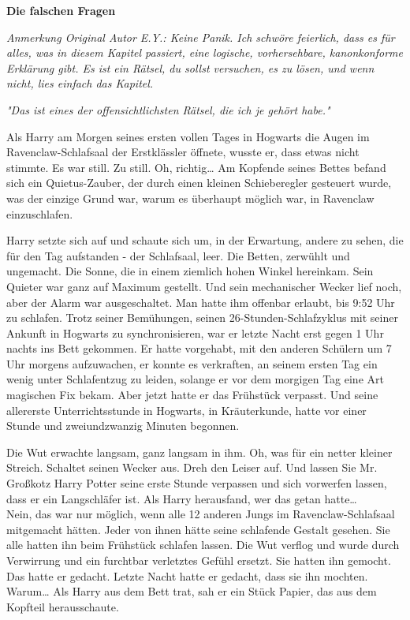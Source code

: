 

\hypertarget{die-falschen-fragen}{%

\textbf{Die falschen Fragen}

\emph{Anmerkung Original Autor E.Y.: Keine Panik. Ich schwöre feierlich, dass es für alles, was in diesem Kapitel passiert, eine logische, vorhersehbare, kanonkonforme Erklärung gibt. Es ist ein Rätsel, du sollst versuchen, es zu lösen, und wenn nicht, lies einfach das Kapitel.}

\emph{"Das ist eines der offensichtlichsten Rätsel, die ich je gehört habe."}

Als Harry am Morgen seines ersten vollen Tages in Hogwarts die Augen im Ravenclaw-Schlafsaal der Erstklässler öffnete, wusste er, dass etwas nicht stimmte. Es war still. Zu still. Oh, richtig… Am Kopfende seines Bettes befand sich ein Quietus-Zauber, der durch einen kleinen Schieberegler gesteuert wurde, was der einzige Grund war, warum es überhaupt möglich war, in Ravenclaw einzuschlafen.

Harry setzte sich auf und schaute sich um, in der Erwartung, andere zu sehen, die für den Tag aufstanden - der Schlafsaal, leer. Die Betten, zerwühlt und ungemacht. Die Sonne, die in einem ziemlich hohen Winkel hereinkam. Sein Quieter war ganz auf Maximum gestellt. Und sein mechanischer Wecker lief noch, aber der Alarm war ausgeschaltet. Man hatte ihm offenbar erlaubt, bis 9:52 Uhr zu schlafen. Trotz seiner Bemühungen, seinen 26-Stunden-Schlafzyklus mit seiner Ankunft in Hogwarts zu synchronisieren, war er letzte Nacht erst gegen 1 Uhr nachts ins Bett gekommen. Er hatte vorgehabt, mit den anderen Schülern um 7 Uhr morgens aufzuwachen, er konnte es verkraften, an seinem ersten Tag ein wenig unter Schlafentzug zu leiden, solange er vor dem morgigen Tag eine Art magischen Fix bekam. Aber jetzt hatte er das Frühstück verpasst. Und seine allererste Unterrichtsstunde in Hogwarts, in Kräuterkunde, hatte vor einer Stunde und zweiundzwanzig Minuten begonnen.

Die Wut erwachte langsam, ganz langsam in ihm. Oh, was für ein netter kleiner Streich. Schaltet seinen Wecker aus. Dreh den Leiser auf. Und lassen Sie Mr. Großkotz Harry Potter seine erste Stunde verpassen und sich vorwerfen lassen, dass er ein Langschläfer ist. Als Harry herausfand, wer das getan hatte…\\ Nein, das war nur möglich, wenn alle 12 anderen Jungs im Ravenclaw-Schlafsaal mitgemacht hätten. Jeder von ihnen hätte seine schlafende Gestalt gesehen. Sie alle hatten ihn beim Frühstück schlafen lassen. Die Wut verflog und wurde durch Verwirrung und ein furchtbar verletztes Gefühl ersetzt. Sie hatten ihn gemocht. Das hatte er gedacht. Letzte Nacht hatte er gedacht, dass sie ihn mochten. Warum… Als Harry aus dem Bett trat, sah er ein Stück Papier, das aus dem Kopfteil herausschaute.

}
